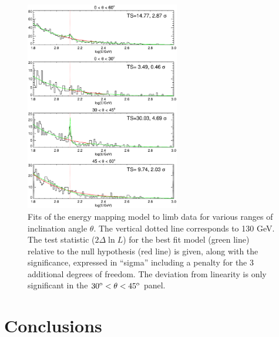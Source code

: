 \documentclass[aps,twocolumn,prd,superscriptaddress,showpacs,nofootinbib,fixfloat]{revtex4}
\newcommand{\degree}{^{\rm o}}
\begin{document}
\begin{figure}[p]
\centering
\includegraphics[width=0.6\textwidth]{plots/limbfits.ps}
\caption{Fits of the energy mapping model to limb data for various ranges of
  inclination angle $\theta$.  The vertical dotted line corresponds to 130
  GeV.  The test statistic ($2\Delta\ln L$) for the best fit model (green
  line) relative to the null hypothesis (red line) is given, along with the
  significance, expressed in ``sigma'' including a penalty for the 3
  additional degrees of freedom.  The deviation from linearity is only
  significant in the $30\degree < \theta < 45\degree$ panel.}
\label{fig:limbfits}
\end{figure}




\section{Conclusions}


\end{document}

